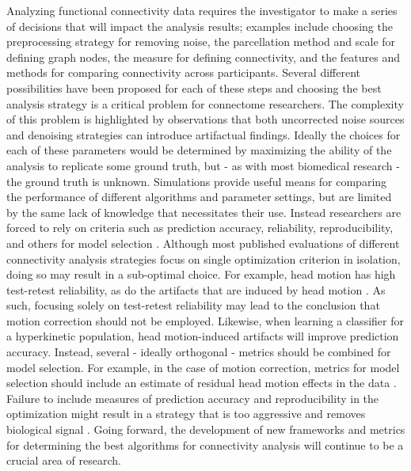 \documentclass{bmcart}
\begin{document}
Analyzing functional connectivity data requires the investigator to make a series of decisions that will impact the analysis results; examples include choosing the preprocessing strategy for removing noise, the parcellation method and scale for defining graph nodes, the measure for defining connectivity, and the features and methods for comparing connectivity across participants. Several different possibilities have been proposed for each of these steps and choosing the best analysis strategy is a critical problem for connectome researchers. The complexity of this problem is highlighted by observations that both uncorrected noise sources \cite{Birn2012, Power2012, VanDijk2012, yan2013comprehensive, satterthwaite2012impact} and denoising strategies \cite{Murphy2009, Saad2012} can introduce artifactual findings. Ideally the choices for each of these parameters would be determined by maximizing the ability of the analysis to replicate some ground truth, but - as with most biomedical research - the ground truth is unknown. Simulations provide useful means for comparing the performance of different algorithms and parameter settings, but are limited by the same lack of knowledge that necessitates their use. Instead researchers are forced to rely on criteria such as prediction accuracy, reliability, reproducibility, and others for model selection \cite{strother2006}. Although most published evaluations of different connectivity analysis strategies focus on single optimization criterion in isolation, doing so may result in a sub-optimal choice. For example, head motion has high test-retest reliability, as do the artifacts that are induced by head motion \cite{yan2013comprehensive}. As such, focusing solely on test-retest reliability may lead to the conclusion that motion correction should not be employed. Likewise, when learning a classifier for a hyperkinetic population, head motion-induced artifacts will improve prediction accuracy\cite{satterthwaite2012improved}. Instead, several - ideally orthogonal - metrics should be combined for model selection.  For example, in the case of motion correction, metrics for model selection should include an estimate of residual head motion effects in the data \cite{Power2012, VanDijk2012, yan2013comprehensive, satterthwaite2012impact}. Failure to include measures of prediction accuracy and reproducibility in the optimization might result in a strategy that is too aggressive and removes biological signal \cite{laconte2003evaluation, strother2002quantitative}. Going forward, the development of new frameworks and metrics for determining the best algorithms for connectivity analysis will continue to be a crucial area of research. 
\end{document}
